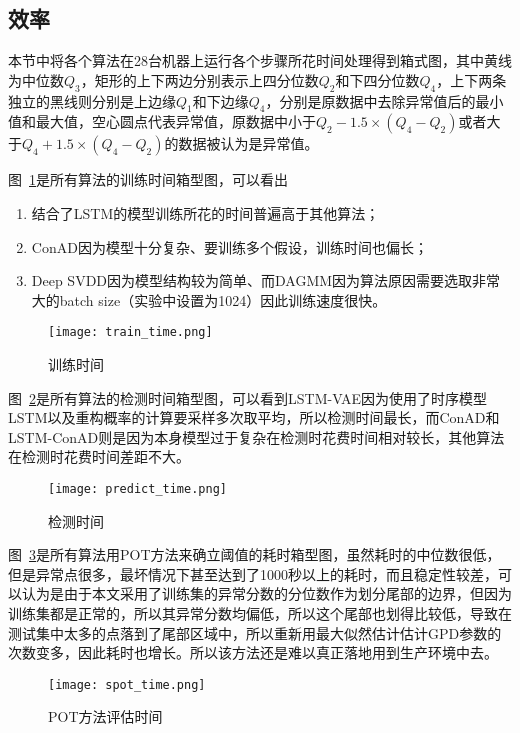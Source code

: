 \subsection{效率}
本节中将各个算法在28台机器上运行各个步骤所花时间处理得到箱式图，其中黄线为中位数$Q_3$，矩形的上下两边分别表示上四分位数$Q_2$和下四分位数$Q_4$，上下两条独立的黑线则分别是上边缘$Q_1$和下边缘$Q_4$，分别是原数据中去除异常值后的最小值和最大值，空心圆点代表异常值，原数据中小于$Q_2-1.5\times(Q_4-Q_2)$或者大于$Q_4 + 1.5\times(Q_4-Q_2)$的数据被认为是异常值。

图~\ref{fig:train:time}是所有算法的训练时间箱型图，可以看出
\begin{enumerate}
  \item 结合了LSTM的模型训练所花的时间普遍高于其他算法；
  \item ConAD因为模型十分复杂、要训练多个假设，训练时间也偏长；
  \item Deep SVDD因为模型结构较为简单、而DAGMM因为算法原因需要选取非常大的batch size（实验中设置为1024）因此训练速度很快。
\end{enumerate}

\begin{figure}[htbp]
  \centering
  \texttt{[image: train\_time.png]}
  \caption{训练时间}
  \label{fig:train:time}
\end{figure}

图~\ref{fig:test:time}是所有算法的检测时间箱型图，可以看到LSTM-VAE因为使用了时序模型LSTM以及重构概率的计算要采样多次取平均，所以检测时间最长，而ConAD和LSTM-ConAD则是因为本身模型过于复杂在检测时花费时间相对较长，其他算法在检测时花费时间差距不大。

\begin{figure}[htbp]
  \centering
  \texttt{[image: predict\_time.png]}
  \caption{检测时间}
  \label{fig:test:time}
\end{figure}

图~\ref{fig:pot:time}是所有算法用POT方法来确立阈值的耗时箱型图，虽然耗时的中位数很低，但是异常点很多，最坏情况下甚至达到了1000秒以上的耗时，而且稳定性较差，可以认为是由于本文采用了训练集的异常分数的分位数作为划分尾部的边界，但因为训练集都是正常的，所以其异常分数均偏低，所以这个尾部也划得比较低，导致在测试集中太多的点落到了尾部区域中，所以重新用最大似然估计估计GPD参数的次数变多，因此耗时也增长。所以该方法还是难以真正落地用到生产环境中去。

\begin{figure}[htbp]
  \centering
  \texttt{[image: spot\_time.png]}
  \caption{POT方法评估时间}
  \label{fig:pot:time}
\end{figure}

